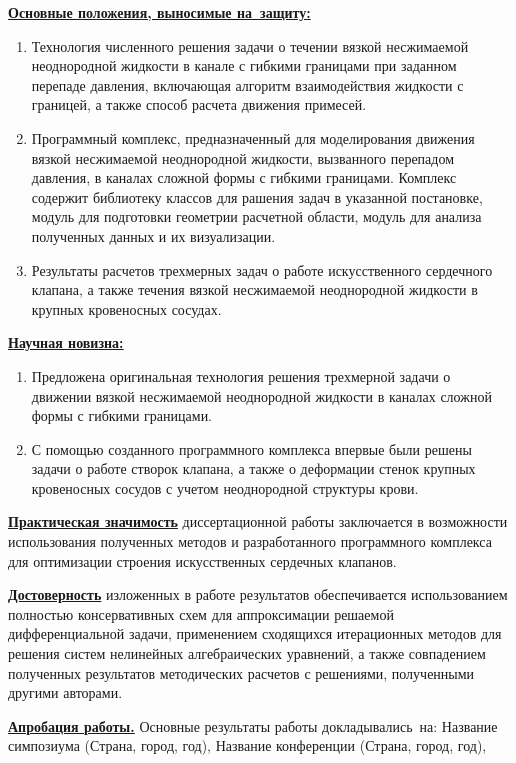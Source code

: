 \underline{\textbf{Основные положения, выносимые на~защиту:}}
\begin{enumerate}
 \item Технология численного решения задачи о течении вязкой несжимаемой неоднородной жидкости
     в канале с гибкими границами при заданном перепаде давления, включающая алгоритм взаимодействия
     жидкости с границей, а также способ расчета движения примесей.
 \item Программный комплекс, предназначенный для моделирования движения вязкой несжимаемой неоднородной
     жидкости, вызванного перепадом давления, в каналах сложной формы с гибкими границами. Комплекс содержит
     библиотеку классов для рашения задач в указанной постановке, модуль для подготовки геометрии расчетной области,
     модуль для анализа полученных данных и их визуализации.
 \item Результаты расчетов трехмерных задач о работе искусственного сердечного клапана, а также течения вязкой несжимаемой
     неоднородной жидкости в крупных кровеносных сосудах.
\end{enumerate}

\underline{\textbf{Научная новизна:}}
\begin{enumerate}
 \item Предложена оригинальная технология решения трехмерной задачи о движении вязкой несжимаемой неоднородной
     жидкости в каналах сложной формы с гибкими границами.
 \item С помощью созданного программного комплекса впервые были решены задачи о работе створок клапана, а также о деформации
     стенок крупных кровеносных сосудов с учетом неоднородной структуры крови.
\end{enumerate}

\underline{\textbf{Практическая значимость}} диссертационной работы заключается в возможности использования полученных методов
и разработанного программного комплекса для оптимизации строения искусственных сердечных клапанов.

\underline{\textbf{Достоверность}} изложенных в работе результатов обеспечивается использованием полностью консервативных схем для аппроксимации
решаемой дифференциальной задачи, применением сходящихся итерационных методов для решения систем нелинейных алгебраических уравнений, а также
совпадением полученных результатов методических расчетов с решениями, полученными другими авторами.

\underline{\textbf{Апробация работы.}}
Основные результаты работы докладывались~на:
Название симпозиума (Страна, город, год),
Название конференции (Страна, город, год),

